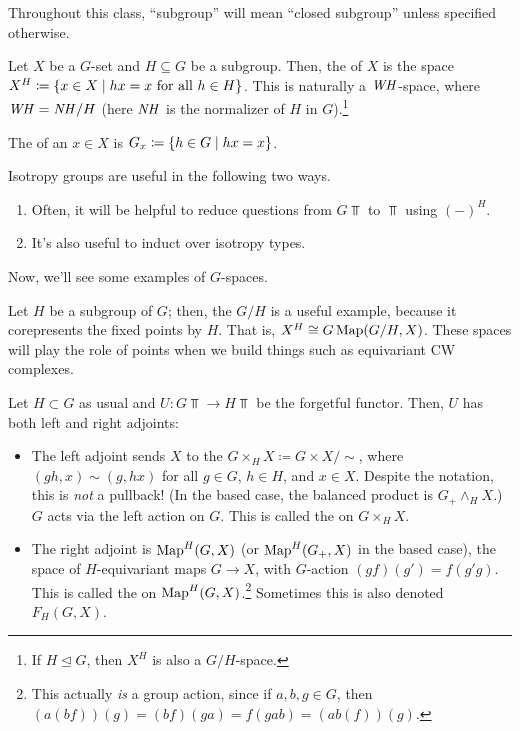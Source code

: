 Throughout this class, ``subgroup'' will mean ``closed subgroup'' unless specified otherwise.
\begin{defn}
Let $X$ be a $G$-set and $H\subseteq G$ be a subgroup. Then, the  of $X$ is the space
$X^H\coloneqq \{x\in X\mid hx = x\text{ for all } h\in H\}$. This is naturally a $\mathit{WH}$-space, where $\mathit{WH} = \mathit{NH}/H$
(here $\mathit{NH}$ is the normalizer of $H$ in $G$).\footnote{If $H\trianglelefteq G$, then $X^H$ is also a $G/H$-space.}
\end{defn}
\begin{defn}
The  of an $x\in X$ is $G_x\coloneqq \{h\in G\mid hx = x\}$.
\end{defn}
Isotropy groups are useful in the following two ways.
\begin{enumerate}
	\item Often, it will be helpful to reduce questions from $G\Top$ to $\Top$ using $(-)^H$.
	\item It's also useful to induct over isotropy types.
\end{enumerate}
Now, we'll see some examples of $G$-spaces.
\begin{exm}
Let $H$ be a subgroup of $G$; then, the  $G/H$ is a useful example, because it corepresents the
fixed points by $H$. That is, $X^H \cong G\operatorname{Map}(G/H, X)$. These spaces will play the role of points when we build
things such as equivariant CW complexes.
\end{exm}
\begin{exm}
Let $H\subset G$ as usual and $U\colon G\Top\to H\Top$ be the forgetful functor. Then, $U$ has both left and right
adjoints:
\begin{itemize}
	\item The left adjoint sends $X$ to the  $G\times_H X\coloneqq G\times X/\sim$, where
	$(gh, x)\sim (g, hx)$ for all $g\in G$, $h\in H$, and $x\in X$. Despite the notation, this is \emph{not} a
	pullback! (In the based case, the balanced product is $G_+\wedge_H X$.) $G$ acts via the left action on $G$.
	This is called the  on $G\times_H X$.
	\item The right adjoint is $\operatorname{Map}^H(G,X)$ (or $\operatorname{Map}^H(G_+, X)$ in the based case), the space of $H$-equivariant
	maps $G\to X$, with $G$-action $(gf)(g') = f(g'g)$. This is called the  on
	$\operatorname{Map}^H(G,X)$.\footnote{This actually \emph{is} a group action, since if $a,b,g\in G$, then $(a(b f))(g) =
	(bf)(ga) = f(gab) = (ab(f))(g)$.} Sometimes this is also denoted $F_H(G, X)$.\qedhere \end{itemize}
\end{exm}

